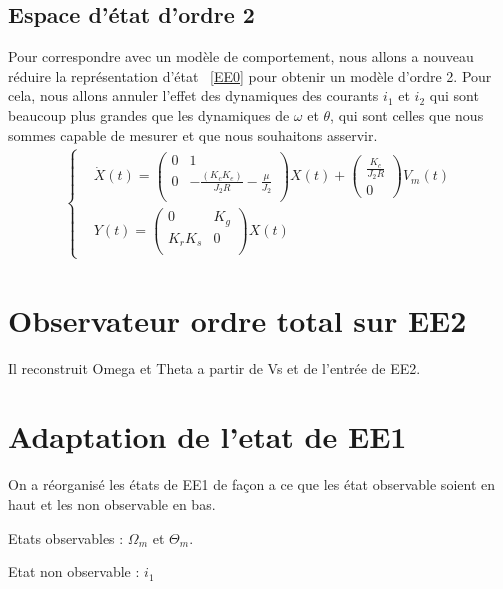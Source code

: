 \subsection{Espace d'état d'ordre 2}
Pour correspondre avec un modèle de comportement, nous allons a nouveau réduire la représentation d'état ~\eqref{EE0} pour obtenir un modèle d'ordre 2. Pour cela, nous allons annuler l'effet des dynamiques des courants $i_1$ et $i_2$ qui sont beaucoup plus grandes que les dynamiques de $\omega$ et $\theta$, qui sont celles que nous sommes capable de mesurer et que nous souhaitons asservir.\\

\begin{align}
\label{EE2}
\left\lbrace
\begin{aligned}
&\dot{X}(t) 
=
 \begin{pmatrix}
0 &	1 \\
0	&	-\frac{(K_cK_e)}{J_2R}-\frac{\mu}{J_2}\\
\end{pmatrix}X(t)
+
\begin{pmatrix}
\frac{K_c}{J_2R}\\
0
\end{pmatrix} 
V_m(t)\\
&Y(t) = \begin{pmatrix}
0	&	K_g	\\
K_rK_s	&	0	\\
\end{pmatrix}X(t)
\end{aligned}
\right.
\end{align}






\section{Observateur ordre total sur EE2}
Il reconstruit Omega et Theta a partir de Vs et de l'entrée de EE2.

\section{Adaptation de l'etat de EE1}
On a réorganisé les états de EE1 de façon a ce que les état observable soient en haut et les non observable en bas.

\noindent\textbullet\hspace{2mm} Etats observables : $\Omega_m$ et $ \Theta_m$.

\noindent\textbullet\hspace{2mm} Etat non observable : $i_1$

